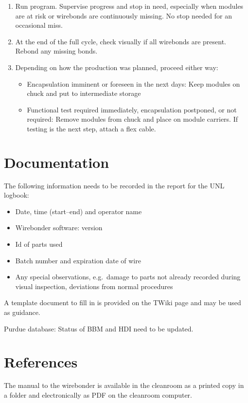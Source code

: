 \documentclass[12pt]{unlsilabsop}
\begin{document}
\begin{enumerate}
    \item Run program. Supervise progress and stop in need, especially when modules are at risk or wirebonds are continuously missing. No stop needed for an occasional miss.
    \item At the end of the full cycle, check visually if all wirebonds are present. Rebond any missing bonds.
    \item Depending on how the production was planned, proceed either way:
    \begin{itemize}
	\item Encapsulation imminent or foreseen in the next days: Keep modules on chuck and put to intermediate storage
	\item Functional test required immediately, encapsulation postponed, or not required: Remove modules from chuck and place on module carriers. If testing is the next step, attach a flex cable.
    \end{itemize}
\end{enumerate}

\section{Documentation}
The following information needs to be recorded in the report for the UNL logbook:
\begin{itemize}
    \item Date, time (start--end) and operator name
    \item Wirebonder software: version
    \item Id of parts used
    \item Batch number and expiration date of wire
    \item Any special observations, e.g.~damage to parts not already recorded during visual inspection, deviations from normal procedures
\end{itemize}
A template document to fill in is provided on the TWiki page and may be used as guidance.

Purdue database: Status of BBM and HDI need to be updated.

\section{References}

The manual to the wirebonder is available in the cleanroom as a printed copy in a folder and electronically as PDF on the cleanroom computer.
\end{document}
